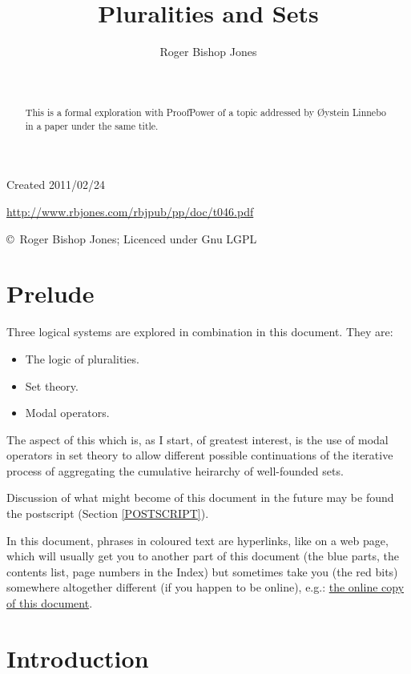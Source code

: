\documentclass[11pt]{article}
\title{Pluralities and Sets}
\author{Roger Bishop Jones}
\date{\ }
\begin{document}
\begin{titlepage}
\maketitle
\begin{abstract}
This is a formal exploration with ProofPower of a topic addressed by {\O}ystein Linnebo in a paper under the same title.
\end{abstract}
\vfill

\begin{centering}
{\footnotesize

Created 2011/02/24



\href{http://www.rbjones.com/rbjpub/pp/doc/t046.pdf}
{http://www.rbjones.com/rbjpub/pp/doc/t046.pdf}

\copyright\ Roger Bishop Jones; Licenced under Gnu LGPL

}%
\end{centering}

\thispagestyle{empty}
\end{titlepage}

\newpage
\addtocounter{page}{1}
{\parskip=0pt\tableofcontents}

\section{Prelude}

Three logical systems are explored in combination in this document.
They are:

\begin{itemize}
\item The logic of pluralities.
\item Set theory.
\item Modal operators.
\end{itemize}

The aspect of this which is, as I start, of greatest interest, is the use of modal operators in set theory to allow different possible continuations of the iterative process of aggregating the cumulative heirarchy of well-founded sets. 

Discussion of what might become of this document in the future may be found the postscript (Section \ref{POSTSCRIPT}).

In this document, phrases in coloured text are hyperlinks, like on a web page, which will usually get you to another part of this document (the blue parts, the contents list, page numbers in the Index) but sometimes take you (the red bits) somewhere altogether different (if you happen to be online), e.g.: \href{http://rbjones.com/rbjpub/pp/doc/t046.pdf}{the online copy of this document}.

\section{Introduction}
\end{document}
